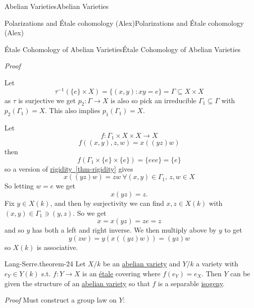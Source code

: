 \documentclass[10pt,]{book}
\makeatletter
\renewcommand*{\proofname}{Proof}
\renewenvironment{proof}[1][\proofname]{\par
  \pushQED{\qed}%
  \normalfont \topsep6\p@\@plus6\p@\relax
  \trivlist
  \item\relax
    {\itshape
    #1\@addpunct{.}}\hspace\labelsep\ignorespaces
}{%
  \popQED\endtrivlist\@endpefalse
}
\numberwithin{equation}{section}
\makeatother
\begin{document}
\begin{chapterptx}{Abelian Varieties}{}{Abelian Varieties}{}{}
\begin{sectionptx}{Polarizations and Étale cohomology (Alex)}{}{Polarizations and Étale cohomology (Alex)}{}{}
\begin{subsectionptx}{Étale Cohomology of Abelian Varieties}{}{Étale Cohomology of Abelian Varieties}{}{}
\begin{proof}
Let%
\begin{equation*}
\tau^{-1}(\{e\} \times X) =  \{(x,y) : xy = e\} = \Gamma \subseteq X\times X
\end{equation*}
as \(\tau \) is surjective we get \(p_2 \colon \Gamma \to X\) is also so pick an irreducible \(\Gamma_1 \subseteq \Gamma\) with \(p_2(\Gamma_1) = X\). This also implies \(p_1(\Gamma_1) = X\).%
\par
\hypertarget{p-289}{}%
Let%
\begin{equation*}
f\colon \Gamma_1 \times X\times X \to X
\end{equation*}
%
\begin{equation*}
f((x,y),z,w) = x((yz)w)
\end{equation*}
then%
\begin{equation*}
f(\Gamma_1 \times\{e\}\times\{e\}) = \{eee\} = \{e\}
\end{equation*}
so a version of \hyperref[thm-rigidity]{rigidity~\ref{thm-rigidity}} gives%
\begin{equation*}
x((yz)w) = zw\ \forall (x,y) \in \Gamma_1,\,z,w\in X
\end{equation*}
So letting \(w = e\) we get%
\begin{equation*}
x(yz) = z\text{.}
\end{equation*}
Fix \(y \in X(k)\), and then by surjectivity we can find \(x,z \in X(k)\) with \((x,y)\in \Gamma_1 \ni (y,z)\). So we get%
\begin{equation*}
x = x(yz) = ze = z
\end{equation*}
and so \(y\) has both a left and right inverse. We then multiply above by \(y\) to get%
\begin{equation*}
y(zw) = y(x((yz)w)) = (yz)w
\end{equation*}
so \(X(k)\) is associative.%
\end{proof}
\begin{theorem}{Lang-Serre.}{}{theorem-24}%
\hypertarget{p-290}{}%
Let \(X/k\) be an \hyperref[def-buntes-abvar]{abelian variety} and \(Y/k\) a variety with \(e_Y\in Y(k)\) s.t. \(f\colon Y \to X\) is an \hyperref[def-etale]{étale} covering where \(f(e_Y) = e_X\). Then \(Y\) can be given the structure of an \hyperref[def-buntes-abvar]{abelian variety} so that \(f\) is a separable \hyperref[def-supersing-isog-isog]{isogeny}.%
\end{theorem}
\begin{proof}\hypertarget{proof-48}{}
\hypertarget{p-291}{}%
Must construct a group law on \(Y\):%
\par

\end{proof}
\end{subsectionptx}
\end{sectionptx}
\end{chapterptx}
\end{document}
